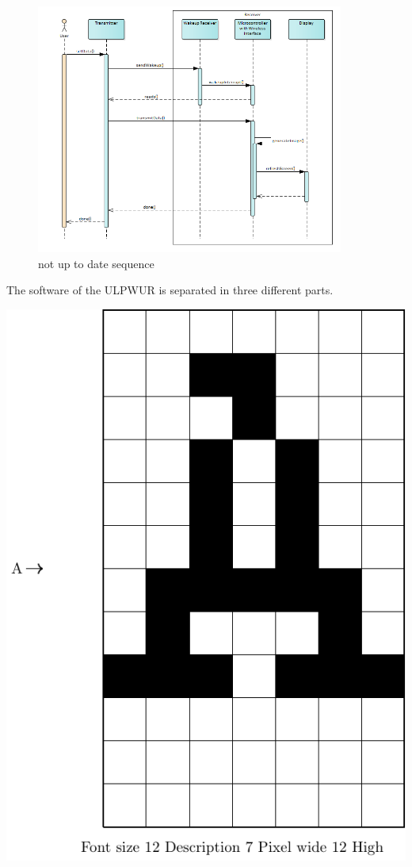 \begin{figure}[ht]
	\centering
	\includegraphics[width=0.9\textwidth]{4-development/software/graphics/1.png}
	\caption{not up to date sequence\label{software:sequence}}
\end{figure}

The software of the ULPWUR is separated in three different parts. 

\includegraphics[scale=0.3]{4-development/software/graphics/font12.pdf}

